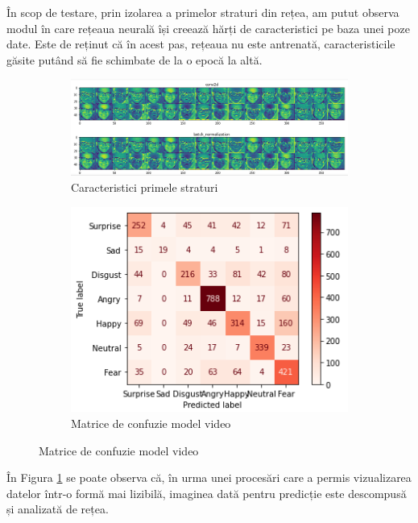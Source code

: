 \documentclass[a4paper, 12pt]{report}
\begin{document}
	În scop de testare, prin izolarea a primelor straturi din rețea, am putut observa modul în care rețeaua neurală își creează hărți de caracteristici pe baza unei poze date. Este de reținut că în acest pas, rețeaua nu este antrenată, caracteristicile găsite putând să fie schimbate de la o epocă la altă.
	
	\begin{figure}
		\centering
		\begin{subfigure}[b]{0.8\textwidth}
			 \includegraphics[width=1\linewidth]{images/video_model_layers_visualisation.png}
			\caption{Caracteristici primele straturi}
			\label{fig:video_model_layers_visualisation}
		\end{subfigure}
		\begin{subfigure}[b]{0.4\textwidth}
			 \includegraphics[width=1\linewidth]{images/video_confusion_matrix.png}
			\caption{Matrice de confuzie model video}
			\label{fig:video_confusion_matrix}
		\end{subfigure}
	\end{figure}

	În Figura \ref{fig:video_model_layers_visualisation} se poate observa că, în urma unei procesări care a permis vizualizarea datelor într-o formă mai lizibilă, imaginea dată pentru predicție este descompusă și analizată de rețea.
\end{document}

